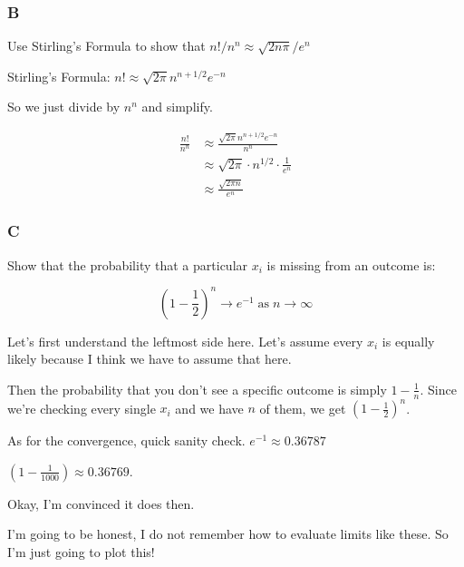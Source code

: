 \subsubsection*{B}

Use Stirling's Formula to show that $n!/n^n \approx \sqrt{2n\pi}/e^n$

\noindent Stirling's Formula: $n! \approx \sqrt{2\pi}n^{n + 1/2} e^{-n}$

So we just divide by $n^n$ and simplify.

\begin{align*}
	\frac{n!}{n^n} &\approx \frac{ \sqrt{2\pi}n^{n + 1/2} e^{-n}}{n^n} \\
	&\approx \sqrt{2\pi} \cdot n^{1/2} \cdot \frac{1}{e^n} \\
	&\approx \frac{\sqrt{2\pi n}}{e^n}
\end{align*}

\subsubsection*{C}

Show that the probability that a particular $x_i$ is missing from an outcome is:

\[\left(1- \frac{1}{2}\right)^n \rightarrow e^{-1} \; \text{as} \; n \rightarrow \infty\]

Let's first understand the leftmost side here. Let's assume every $x_i$ is equally likely because I think we have to assume that here. 

Then the probability that you don't see a specific outcome is simply $1 - \frac{1}{n}$. Since we're checking every single $x_i$ and we have $n$ of them, we get $\left( 1 - \frac{1}{2} \right)^n$.

As for the convergence, quick sanity check. $e^{-1} \approx 0.36787$

$(1 - \frac{1}{1000}) \approx 0.36769$. 

Okay, I'm convinced it does then.

I'm going to be honest, I do not remember how to evaluate limits like these. So I'm just going to plot this!

